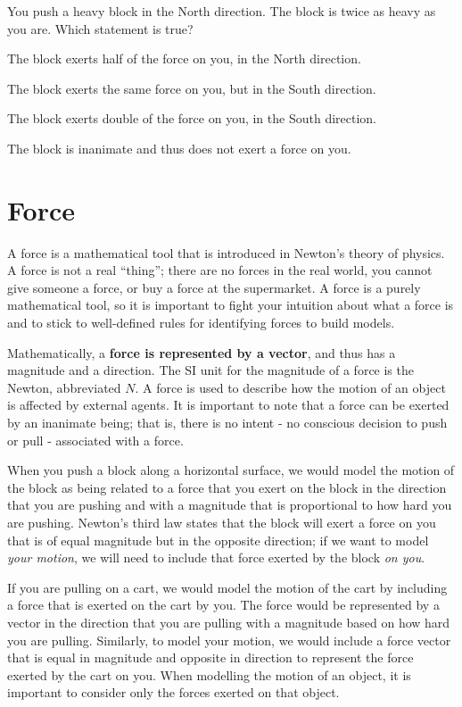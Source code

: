 \begin{checkpointMC}{You push a heavy block in the North direction. The block is twice as heavy as you are. Which statement is true?}
\item The block exerts half of the force on you, in the North direction.
\item The block exerts the same force on you, but in the South direction. %
\item The block exerts double of the force on you, in the South direction.
\item The block is inanimate and thus does not exert a force on you. 
\end{checkpointMC}

\section{Force}
A force is a mathematical tool that is introduced in Newton's theory of physics. A force is not a real ``thing''; there are no forces in the real world, you cannot give someone a force, or buy a force at the supermarket. A force is a purely mathematical tool, so it is important to fight your intuition about what a force is and to stick to well-defined rules for identifying forces to build models.

Mathematically, a \textbf{force is represented by a vector}, and thus has a magnitude and a direction. The SI unit for the magnitude of a force is the Newton, abbreviated $\si{N}$. A force is used to describe how the motion of an object is affected by external agents. It is important to note that a force can be exerted by an inanimate being; that is, there is no intent - no conscious decision to push or pull - associated with a force.

When you push a block along a horizontal surface, we would model the motion of the block as being related to a force that you exert on the block in the direction that you are pushing and with a magnitude that is proportional to how hard you are pushing. Newton's third law states that the block will exert a force on you that is of equal magnitude but in the opposite direction; if we want to model \textit{your motion}, we will need to include that force exerted by the block \textit{on you}. 

If you are pulling on a cart, we would model the motion of the cart by including a force that is exerted on the cart by you. The force would be represented by a vector in the direction that you are pulling with a magnitude based on how hard you are pulling. Similarly, to model your motion, we would include a force vector that is equal in magnitude and opposite in direction to represent the force exerted by the cart on you. When modelling the motion of an object, it is important to consider only the forces exerted on that object.

